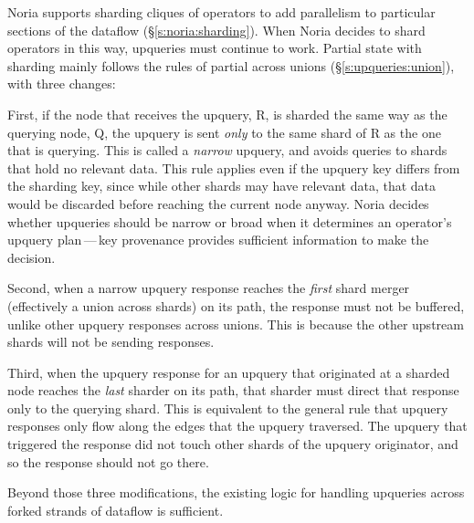 Noria supports sharding cliques of operators to add parallelism to particular
sections of the dataflow (\S\ref{s:noria:sharding}). When Noria decides to shard
operators in this way, upqueries must continue to work. Partial state with
sharding mainly follows the rules of partial across unions
(\S\ref{s:upqueries:union}), with three changes:

First, if the node that receives the upquery, R, is sharded the same way as the
querying node, Q, the upquery is sent \emph{only} to the same shard of R as the
one that is querying. This is called a \textit{narrow} upquery, and avoids
queries to shards that hold no relevant data. This rule applies even if the
upquery key differs from the sharding key, since while other shards may have
relevant data, that data would be discarded before reaching the current node
anyway. Noria decides whether upqueries should be narrow or broad when it
determines an operator's upquery plan\,---\,key provenance provides sufficient
information to make the decision.

Second, when a narrow upquery response reaches the \emph{first} shard merger
(effectively a union across shards) on its path, the response must not be
buffered, unlike other upquery responses across unions. This is because
the other upstream shards will not be sending responses.

Third, when the upquery response for an upquery that originated at a sharded
node reaches the \emph{last} sharder on its path, that sharder must direct that
response only to the querying shard. This is equivalent to the general rule that
upquery responses only flow along the edges that the upquery traversed. The
upquery that triggered the response did not touch other shards of the upquery
originator, and so the response should not go there.

Beyond those three modifications, the existing logic for handling upqueries
across forked strands of dataflow is sufficient.

